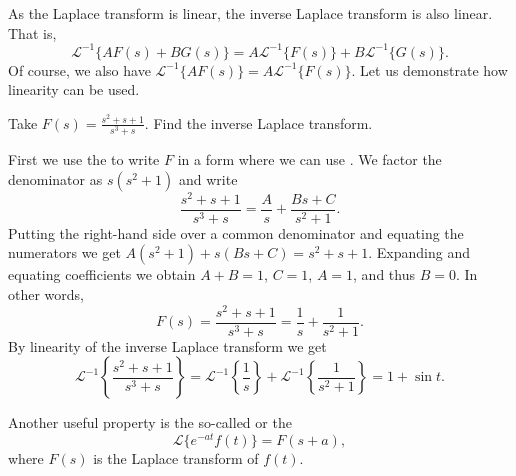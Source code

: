 \documentclass{ximera}
\begin{document}
As the Laplace transform is linear, the inverse Laplace transform is also linear.  That is,
\begin{equation*}
    {\mathcal{L}}^{-1} \bigl\{ A F(s) + B G(s) \bigr\} = A {\mathcal{L}}^{-1} \bigl\{ F(s) \bigr\} + B {\mathcal{L}}^{-1} \bigl\{ G(s) \bigr\} .
\end{equation*}
Of course, we also have ${\mathcal{L}}^{-1} \bigl\{ A F(s) \bigr\} = A {\mathcal{L}}^{-1} \bigl\{ F(s) \bigr\}$. Let us demonstrate how linearity can be used.

\begin{example}
    Take $F(s) = \frac{s^2+s+1}{s^3+s}$.  Find the inverse Laplace transform.
\end{example}

\begin{exampleSol}
    First we use the \emph{} to write $F$ in a form where we can use .  We factor the denominator as $s(s^2+1)$ and write
    \begin{equation*}
        \frac{s^2+s+1}{s^3+s} = \frac{A}{s} + \frac{Bs+C}{s^2+1} .
    \end{equation*}
    Putting the right-hand side over a common denominator and equating the numerators we get $A(s^2+1) + s(Bs+C) = s^2+s+1$.  Expanding and equating coefficients we obtain $A+B = 1$, $C=1$, $A=1$, and thus $B=0$.  In other words,
    \begin{equation*}
        F(s) = \frac{s^2+s+1}{s^3+s} = \frac{1}{s} + \frac{1}{s^2+1} .
    \end{equation*}
    By linearity of the inverse Laplace transform we get 
    \begin{equation*}
        {\mathcal{L}}^{-1} 
        \left\{ 
            \frac{s^2+s+1}{s^3+s} 
        \right\}
        = {\mathcal{L}}^{-1} 
        \left\{ 
            \frac{1}{s} 
        \right\} 
        + {\mathcal{L}}^{-1} 
        \left\{ 
            \frac{1}{s^2+1} 
        \right\} 
        = 1 + \sin t .
    \end{equation*}
\end{exampleSol}

Another useful property is the so-called \emph{} or the \emph{}
\begin{equation*}
    \mathcal{L} \bigl\{ e^{-at} f(t) \bigr\} = F(s+a) ,
\end{equation*}
where $F(s)$ is the Laplace transform of $f(t)$.
\end{document}
